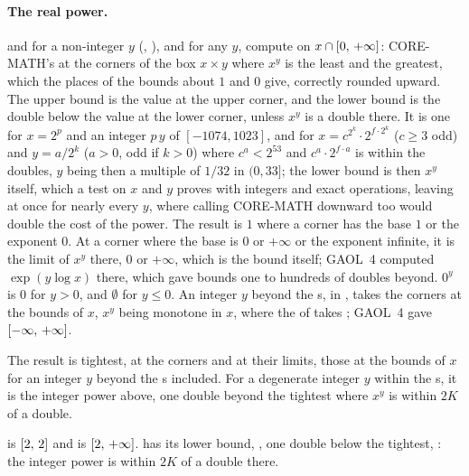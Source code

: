 \documentclass[12pt,a4paper,twoside,openright]{book}
\begin{document}
\paragraph{The real power.}
 and  for a non-integer $y$
(, ), and
 for any $y$, compute  on
$x\cap[0,\,+\infty]$: CORE-MATH's  at the corners of the box
$x\times y$ where $x^y$ is the least and the greatest, which the places of
the bounds about $1$ and $0$ give, correctly rounded upward. The upper bound
is the value at the upper corner, and the lower bound is the double below
the value at the lower corner, unless $x^y$ is a double there. It is one
for $x=2^p$ and an integer $p\,y$ of $[-1074, 1023]$, and for
$x=c^{2^k}\cdot2^{f\cdot2^k}$ ($c\geq3$ odd) and $y=a/2^k$ ($a>0$, odd if
$k>0$) where $c^a<2^{53}$ and $c^a\cdot2^{f\cdot a}$ is within the doubles,
$y$ being then a multiple of $1/32$ in $(0, 33]$; the lower bound is then
$x^y$ itself, which a test on $x$ and $y$ proves with integers and exact
operations, leaving at once for nearly every $y$, where calling CORE-MATH
downward too would double the cost of the power.\newinvfive{} The result
is $1$ where a corner has the base $1$ or the exponent $0$. At a corner
where the base is $0$ or $+\infty$ or the exponent infinite, it is the
limit of $x^y$ there, $0$ or $+\infty$, which is the bound itself; GAOL~4
computed $\exp(y\log x)$ there, which gave bounds one to hundreds of
doubles beyond.\newinvfive{} $0^y$ is $0$ for $y>0$, and $\emptyset$ for
$y\leq0$. An integer $y$ beyond the s, in
, takes the corners at the bounds of $x$, $x^y$
being monotone in $x$, where the  of  takes
; GAOL~4 gave $[-\infty,\,+\infty]$.\newinvfive

The result is tightest, at the corners and at their limits, those at the
bounds of $x$ for an integer $y$ beyond the s included. For a
degenerate integer $y$ within the s, it is the integer power
above, one double beyond the tightest where $x^y$ is within $2K$ of a
double.

\begin{Ex}
 is $[2,\,2]$ and  is
$[2,\,+\infty]$. 
has its lower bound, , one double below the
tightest, : the integer power is within $2K$ of
a double there.
\end{Ex}
\end{document}

